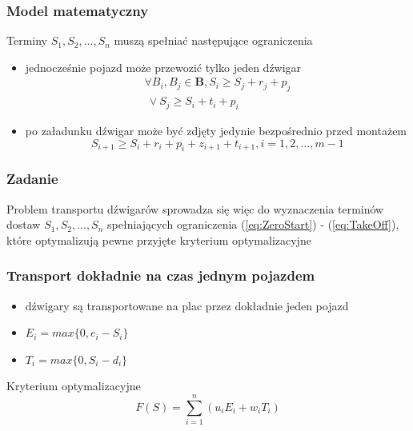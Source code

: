 \documentclass{beamer}
\begin{document}
 \begin{frame}
 \frametitle{Model matematyczny}
 
 \begin{block}{Terminy $S_1, S_2,...,S_n $ muszą spełniać następujące ograniczenia}
 \begin{itemize}
       \item jednocześnie pojazd może przewozić tylko jeden dźwigar
     \begin{equation}\label{eq:OneVehicle}
     \begin{split}
      \forall B_i, B_j \in \textbf{B}, S_i \ge S_j + r_j + p_j
      \\ \   \vee S_j \ge S_i + t_i + p_i
     \end{split}
     \end{equation}
     \item po załadunku dźwigar może być zdjęty jedynie bezpośrednio przed montażem
      \begin{equation}\label{eq:TakeOff}
      S_{i+1} \ge S_i + r_i + p_i + z_{i+1} + t_{i+1}, i = 1,2,...,m-1
      \end{equation}        
 \end{itemize}
 \end{block}
\end{frame}

\begin{frame}
 \frametitle{Zadanie}
 \begin{block}{}
 Problem transportu dźwigarów sprowadza się więc do wyznaczenia terminów dostaw $S_1, S_2,...,S_n $ spełniających ograniczenia (\ref{eq:ZeroStart})
 - (\ref{eq:TakeOff}), które optymalizują pewne przyjęte kryterium optymalizacyjne
  
 \end{block}
\end{frame}


\begin{frame}
 \frametitle{Transport dokładnie na czas jednym pojazdem}
 \begin{itemize}
  \item dźwigary są transportowane na plac przez dokładnie jeden pojazd
 \end{itemize}
 \begin{block}{}
 \begin{itemize}
 \item $ E_i = max \lbrace 0, e_i - S_i \rbrace $ 
 \item $ T_i = max \lbrace 0, S_i - d_i \rbrace $
 \end{itemize}
 \end{block}
 
 \begin{block}{Kryterium optymalizacyjne}
  \begin{equation}
   F(S) = \sum\limits_{i=1}^{n}(u_iE_i + w_iT_i) 
  \end{equation}
 \end{block}

\end{frame}
\end{document}
